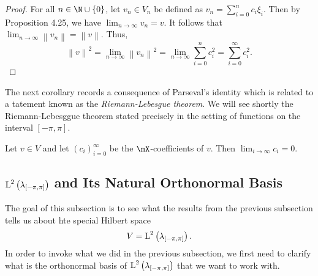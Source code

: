 \documentclass[pmath450]{subfiles}
\begin{document}
    \begin{proof}
        For all $n\in\N\cup\left\lbrace 0 \right\rbrace$, let $v_n\in V_n$ be defined as $v_n = \sum^{n}_{i=0}c_i\xi_i$. Then by Proposition 4.25, we have $\lim_{n\to\infty}v_n = v$. It follows that $\lim_{n\to\infty}\left\lVert v_n\right\rVert = \left\lVert v\right\rVert$. Thus,
        \begin{equation*}
            \left\lVert v\right\rVert^{2} = \lim_{n\to\infty}\left\lVert v_n\right\rVert^{2} = \lim_{n\to\infty} \sum^{n}_{i=0}c_i^{2} = \sum^{\infty}_{i=0}c_i^{2}.
        \end{equation*}
    \end{proof}

    \np The next corollary records a consequence of Parseval's identity which is related to a tatement known as the \textit{Riemann-Lebesgue theorem}. We will see shortly the Riemann-Lebesggue theorem stated precisely in the setting of functions on the interval $\left[ -\pi,\pi \right]$.

    \begin{cor}{}
        Let $v\in V$ and let $\left( c_{i} \right)^{\infty}_{i=0}$ be the $\mX$-coefficients of $v$. Then $\lim_{i\to\infty}c_i=0$.
    \end{cor}	

    
    \clearpage

    \subsection{$\operatorname{L}^{2}\left( \lambda_{\left[ -\pi,\pi \right]} \right)$ and Its Natural Orthonormal Basis}
    
    The goal of this subsection is to see what the results from the previous subsection tells us about hte special Hilbert space
    \begin{equation*}
        V = \operatorname{L}^{2}\left( \lambda_{\left[ -\pi,\pi \right]} \right).
    \end{equation*}
    In order to invoke what we did in the previous subsection, we first need to clarify what is the orthonormal basis of $\operatorname{L}^{2}\left( \lambda_{\left[ -\pi,\pi \right]} \right)$ that we want to work with.
\end{document}
